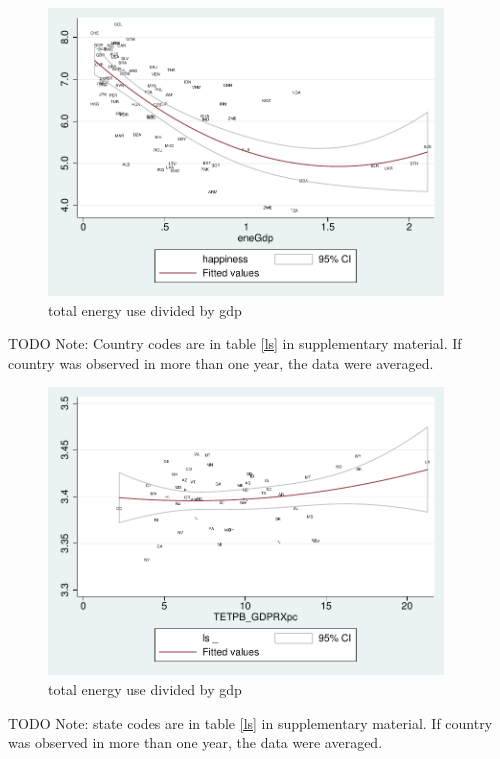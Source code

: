 \documentclass[10pt, letterpaper]{article}
\begin{document}
\begin{spacing}{1.4}
\begin{figure}[H]
 \includegraphics[height=3in]{graphsAndTables/couWvsLsEnePerGdp.pdf}\centering
\caption{total energy use divided by gdp}\label{}
\end{figure}
{\scriptsize TODO Note: Country codes are in table \ref{ls} in supplementary
  material. If country was observed in more than one year, the data were averaged.}

\begin{figure}[H]
 \includegraphics[height=3in]{graphsAndTables/lfTETPBgdpLS.pdf}\centering
\caption{total energy use divided by gdp}\label{}
\end{figure}
{\scriptsize TODO Note: state codes are in table \ref{ls} in supplementary
  material. If country was observed in more than one year, the data were averaged.}


\end{spacing}
\end{document}
